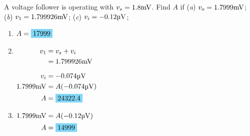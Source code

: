 A voltage follower is operating with $v_s = 1.8 \qw{\mV}$. Find $A$ if (\emph{a}) $v_o = 1.7999 \qw{\mV}$; (\emph{b}) $v_1 = 1.799926 \qw{\mV}$; (\emph{c}) $v_i = -0.12 \qw{\micro\V}$; 
\begin{enumerate}[leftmargin=2cm,labelsep=.5cm,label=\bfseries\alph*)]
	\item $
	\begin{aligned}[t]
	A &= \hlbox{17999}
	\end{aligned} $
	\\[1cm]
	
	\item $
	\begin{aligned}[t]
	v_1 &= v_s+v_i \\
	&= 1.799926 \qw{\mV} \\[2mm]
	v_i &= -0.074 \qw{\micro\V} \\
	1.7999\qw{\mV} &= A(-0.074 \qw{\micro\V}) \\
	A &= \hlbox{24322.4}
	\end{aligned} $
	\\[1cm]
	
	\item $
	\begin{aligned}[t]
	1.7999\qw{\mV} &= A(-0.12 \qw{\micro\V}) \\
	A &= \hlbox{14999}
	\end{aligned} $
	\\[1cm]
\end{enumerate}
